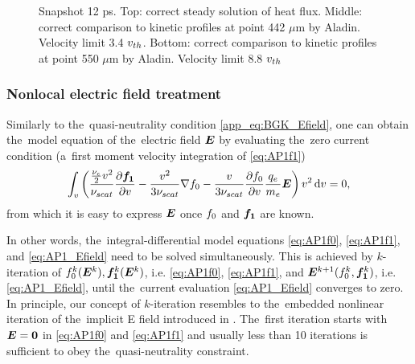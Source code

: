 \begin{figure}[tbh]
\begin{center}
\begin{tabular}{c}
    \end{tabular}
  \caption{  
  Snapshot 12 ps. Top: correct steady solution of heat flux.  
  Middle: correct comparison to kinetic profiles at point 442 $\mu$m by Aladin. 
  Velocity limit 3.4 $v_{th}$.
  Bottom: correct comparison to kinetic profiles at point 550 $\mu$m by Aladin.
  Velocity limit 8.8 $v_{th}$
  }
  \label{fig:C7_Aladin_case3}
  \end{center} 
\end{figure}


\subsubsection{Nonlocal electric field treatment}
\label{sec:Efield}

Similarly to the~quasi-neutrality condition \eqref{app_eq:BGK_Efield}, 
one can obtain the~model equation of the~electric field $\boldsymbol{E}$ by evaluating 
the~zero current condition (a~first moment velocity integration of 
\eqref{eq:AP1f1})
\begin{equation}
  \int_{v} \left(\frac{\frac{\nu_{e}}{2}v^2}{\nu_{scat}}
  \frac{\partial{\boldsymbol{f_1}}}{\partial{v}} 
  - \frac{v^2}{3\nu_{scat}}
  \nabla f_0 
  - \frac{v}{3\nu_{scat}}\frac{\partial{f_0}}{\partial{v}}\frac{q_e}{m_e}\boldsymbol{E}
  \right) v^2\, \text{d}v = 0 ,
  \label{eq:AP1_Efield}
\end{equation}
from which it is easy to express $\boldsymbol{E}$ once $f_0$ and $\boldsymbol{f_1}$ are known.

In other words, the~integral-differential model equations 
\eqref{eq:AP1f0}, \eqref{eq:AP1f1}, and \eqref{eq:AP1_Efield}
need to be solved simultaneously. This is achieved by $k$-iteration of 
$f_0^k(\boldsymbol{E}^k), \boldsymbol{f_1}^k(\boldsymbol{E}^k)$, i.e. \eqref{eq:AP1f0}, \eqref{eq:AP1f1}, and 
$\boldsymbol{E}^{k+1}(f_0^k, \boldsymbol{f_1}^k)$, i.e.  \eqref{eq:AP1_Efield}, until 
the~current evaluation \eqref{eq:AP1_Efield} converges to zero. In principle,
our concept of $k$-iteration resembles to the~embedded nonlinear iteration
of the~implicit E field introduced in \cite{Kingham_JCP2004}.
The~first iteration starts with $\boldsymbol{E}=\boldsymbol{0}$ in \eqref{eq:AP1f0} and 
\eqref{eq:AP1f1} and usually less than 10 iterations is sufficient to obey
the~quasi-neutrality constraint.

